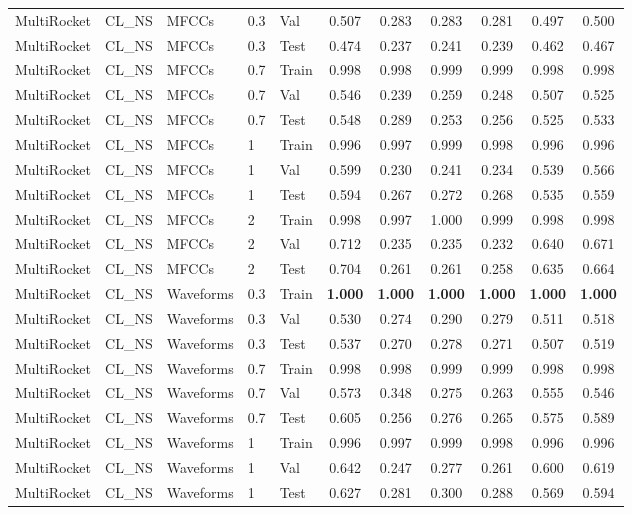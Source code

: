 \begin{landscape}
\begin{longtable}{|l|l|l|l|l|c|c|c|c|c|c|}
MultiRocket & CL\_NS & MFCCs & 0.3 & Val & 0.507 & 0.283 & 0.283 & 0.281 & 0.497 & 0.500 \\
MultiRocket & CL\_NS & MFCCs & 0.3 & Test & 0.474 & 0.237 & 0.241 & 0.239 & 0.462 & 0.467 \\
MultiRocket & CL\_NS & MFCCs & 0.7 & Train & 0.998 & 0.998 & 0.999 & 0.999 & 0.998 & 0.998 \\
MultiRocket & CL\_NS & MFCCs & 0.7 & Val & 0.546 & 0.239 & 0.259 & 0.248 & 0.507 & 0.525 \\
MultiRocket & CL\_NS & MFCCs & 0.7 & Test & 0.548 & 0.289 & 0.253 & 0.256 & 0.525 & 0.533 \\
MultiRocket & CL\_NS & MFCCs & 1 & Train & 0.996 & 0.997 & 0.999 & 0.998 & 0.996 & 0.996 \\
MultiRocket & CL\_NS & MFCCs & 1 & Val & 0.599 & 0.230 & 0.241 & 0.234 & 0.539 & 0.566 \\
MultiRocket & CL\_NS & MFCCs & 1 & Test & 0.594 & 0.267 & 0.272 & 0.268 & 0.535 & 0.559 \\
MultiRocket & CL\_NS & MFCCs & 2 & Train & 0.998 & 0.997 & 1.000 & 0.999 & 0.998 & 0.998 \\
MultiRocket & CL\_NS & MFCCs & 2 & Val & 0.712 & 0.235 & 0.235 & 0.232 & 0.640 & 0.671 \\
MultiRocket & CL\_NS & MFCCs & 2 & Test & 0.704 & 0.261 & 0.261 & 0.258 & 0.635 & 0.664 \\
MultiRocket & CL\_NS & Waveforms & 0.3 & Train & \textbf{1.000} & \textbf{1.000} & \textbf{1.000} & \textbf{1.000} & \textbf{1.000} & \textbf{1.000} \\
MultiRocket & CL\_NS & Waveforms & 0.3 & Val & 0.530 & 0.274 & 0.290 & 0.279 & 0.511 & 0.518 \\
MultiRocket & CL\_NS & Waveforms & 0.3 & Test & 0.537 & 0.270 & 0.278 & 0.271 & 0.507 & 0.519 \\
MultiRocket & CL\_NS & Waveforms & 0.7 & Train & 0.998 & 0.998 & 0.999 & 0.999 & 0.998 & 0.998 \\
MultiRocket & CL\_NS & Waveforms & 0.7 & Val & 0.573 & 0.348 & 0.275 & 0.263 & 0.555 & 0.546 \\
MultiRocket & CL\_NS & Waveforms & 0.7 & Test & 0.605 & 0.256 & 0.276 & 0.265 & 0.575 & 0.589 \\
MultiRocket & CL\_NS & Waveforms & 1 & Train & 0.996 & 0.997 & 0.999 & 0.998 & 0.996 & 0.996 \\
MultiRocket & CL\_NS & Waveforms & 1 & Val & 0.642 & 0.247 & 0.277 & 0.261 & 0.600 & 0.619 \\
MultiRocket & CL\_NS & Waveforms & 1 & Test & 0.627 & 0.281 & 0.300 & 0.288 & 0.569 & 0.594 \\

\end{longtable}
\end{landscape}

